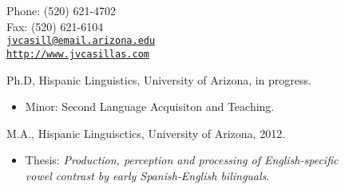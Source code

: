 \documentclass[11pt]{article}
\makeatletter
\def\myemail{jvcasill@email.arizona.edu}
\def\myweb{http://www.jvcasillas.com}
\def\myphone{(520) 621-4702}
\def\myfax{(520) 621-6104}
\makeatother
\begin{document}
\begin{minipage}[t]{2.95in}
  
\end{minipage}
\hfill     
\hfill
\begin{minipage}[t]{1.7in}
  \flushright \footnotesize Phone: \myphone \\ 
  Fax: \myfax  \\ 
  {\scriptsize \texttt{\href{mailto:\myemail}{\myemail}}} \\
  {\scriptsize \texttt{\href{\myweb}{\myweb}}}
\end{minipage}


\bigskip

\vspace{.1in}
\reversemarginpar

\bigskip       




\noindent Ph.D, Hispanic Linguistics, University of Arizona, in progress. \vspace{-0.1in}
\begin{itemize}
  \item \small Minor: Second Language Acquisiton and Teaching.
\end{itemize} 

\noindent M.A., Hispanic Linguisctics, University of Arizona, 2012. \vspace{-0.1in}
\begin{itemize}
  \item \small Thesis: \emph{Production, perception and processing of English-specific \\vowel contrast by early Spanish-English bilinguals}.
\end{itemize} 
\end{document}
